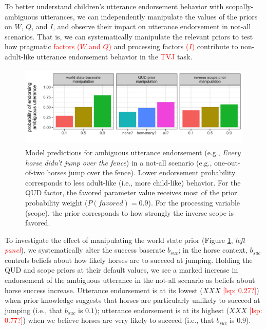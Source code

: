 \documentclass[preprint,authoryear]{elsarticle}\frenchspacing
\newcommand{\lsp}[1]{\textcolor{red}{[lsp: #1]}}
\newcommand{\lp}[1]{\textcolor{red}{#1}} %
\begin{document}
To better understand children's utterance endorsement behavior with scopally-ambiguous utterances, we can independently manipulate the values of the priors on $W$, $Q$, and $I$, and observe their impact on utterance endorsement in not-all scenarios. That is, we can systematically manipulate the relevant priors to test how pragmatic 
\lp{factors ($W$ and $Q$)} and processing factors 
\lp{($I$)}
contribute to non-adult-like utterance endorsement behavior in the 
\lp{TVJ}
task.


\begin{figure}[t]
\centering
\includegraphics[height=1.55in]{every-not-plot.png}
\vspace{-15pt}
\caption{Model predictions for ambiguous utterance endorsement (e.g., \emph{Every horse didn't jump over the fence}) in a not-all scenario (e.g., one-out-of-two horses jump over the fence). Lower endorsement probability corresponds to less adult-like (i.e., more child-like) behavior. For the QUD factor, the favored parameter value receives most of the prior probability weight ($P(favored) = 0.9$). For the processing variable (scope), the prior corresponds to how strongly the inverse scope is favored.}
\label{fig:every-not-plot}
\end{figure}


To investigate the effect of manipulating the world state prior (Figure \ref{fig:every-not-plot}, \emph{left \lp{panel}}), we systematically alter the success baserate $b_{suc}$; in the horse context, $b_{suc}$ controls beliefs about how likely
horses are to succeed at jumping. Holding the QUD and scope priors at their default values, we see a marked increase in endorsement of the ambiguous utterance in the not-all scenario as beliefs about horse success increase. Utterance endorsement is at its lowest ($XXX$ \lsp{0.27?}) when prior knowledge suggests that horses are particularly unlikely to succeed at jumping (i.e., that $b_{suc}$ is $0.1$); utterance endorsement is at its highest ($XXX$ \lsp{0.77?}) when we believe horses are very likely to succeed (i.e., that $b_{suc}$ is $0.9$).
\end{document}
